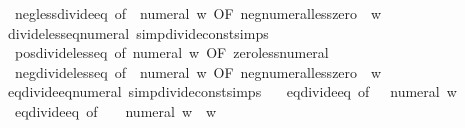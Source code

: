 \begin{isabellebody}
\ \ neg{\isacharunderscore}{\kern0pt}less{\isacharunderscore}{\kern0pt}divide{\isacharunderscore}{\kern0pt}eq\ {\isacharbrackleft}{\kern0pt}of\ {\isachardoublequoteopen}{\isacharminus}{\kern0pt}\ numeral\ w{\isachardoublequoteclose}{\isacharcomma}{\kern0pt}\ OF\ neg{\isacharunderscore}{\kern0pt}numeral{\isacharunderscore}{\kern0pt}less{\isacharunderscore}{\kern0pt}zero{\isacharbrackright}{\kern0pt}\ \ w\isanewline
\isanewline
{}\isamarkupfalse%
\ divide{\isacharunderscore}{\kern0pt}less{\isacharunderscore}{\kern0pt}eq{\isacharunderscore}{\kern0pt}numeral{}\ {\isacharbrackleft}{\kern0pt}simp{\isacharcomma}{\kern0pt}divide{\isacharunderscore}{\kern0pt}const{\isacharunderscore}{\kern0pt}simps{\isacharbrackright}{\kern0pt}\ {\isacharequal}{\kern0pt}\isanewline
\ \ pos{\isacharunderscore}{\kern0pt}divide{\isacharunderscore}{\kern0pt}less{\isacharunderscore}{\kern0pt}eq\ {\isacharbrackleft}{\kern0pt}of\ {\isachardoublequoteopen}numeral\ w{\isachardoublequoteclose}{\isacharcomma}{\kern0pt}\ OF\ zero{\isacharunderscore}{\kern0pt}less{\isacharunderscore}{\kern0pt}numeral{\isacharbrackright}{\kern0pt}\isanewline
\ \ neg{\isacharunderscore}{\kern0pt}divide{\isacharunderscore}{\kern0pt}less{\isacharunderscore}{\kern0pt}eq\ {\isacharbrackleft}{\kern0pt}of\ {\isachardoublequoteopen}{\isacharminus}{\kern0pt}\ numeral\ w{\isachardoublequoteclose}{\isacharcomma}{\kern0pt}\ OF\ neg{\isacharunderscore}{\kern0pt}numeral{\isacharunderscore}{\kern0pt}less{\isacharunderscore}{\kern0pt}zero{\isacharbrackright}{\kern0pt}\ \ w\isanewline
\isanewline
{}\isamarkupfalse%
\ eq{\isacharunderscore}{\kern0pt}divide{\isacharunderscore}{\kern0pt}eq{\isacharunderscore}{\kern0pt}numeral{}\ {\isacharbrackleft}{\kern0pt}simp{\isacharcomma}{\kern0pt}divide{\isacharunderscore}{\kern0pt}const{\isacharunderscore}{\kern0pt}simps{\isacharbrackright}{\kern0pt}\ {\isacharequal}{\kern0pt}\isanewline
\ \ eq{\isacharunderscore}{\kern0pt}divide{\isacharunderscore}{\kern0pt}eq\ {\isacharbrackleft}{\kern0pt}of\ {\isacharunderscore}{\kern0pt}\ {\isacharunderscore}{\kern0pt}\ {\isachardoublequoteopen}numeral\ w{\isachardoublequoteclose}{\isacharbrackright}{\kern0pt}\isanewline
\ \ eq{\isacharunderscore}{\kern0pt}divide{\isacharunderscore}{\kern0pt}eq\ {\isacharbrackleft}{\kern0pt}of\ {\isacharunderscore}{\kern0pt}\ {\isacharunderscore}{\kern0pt}\ {\isachardoublequoteopen}{\isacharminus}{\kern0pt}\ numeral\ w{\isachardoublequoteclose}{\isacharbrackright}{\kern0pt}\ \ w\isanewline
\isanewline
{}\isamarkupfalse%

\end{isabellebody}
